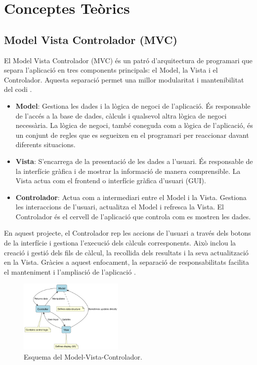 \documentclass{ieeetj}
\begin{document}
\section{Conceptes Teòrics} 

\subsection{Model Vista Controlador (MVC)} 
El Model Vista Controlador (MVC) és un patró d'arquitectura de programari que separa l'aplicació en tres components principals: el Model, la Vista i el Controlador. Aquesta separació permet una millor modularitat i mantenibilitat del codi \cite{MVC_Theory}.

\begin{itemize} 
    \item \textbf{Model}: Gestiona les dades i la lògica de negoci de l'aplicació. És responsable de l'accés a la base de dades, càlculs i qualsevol altra lògica de negoci necessària. La lògica de negoci, també coneguda com a lògica de l'aplicació, és un conjunt de regles que es segueixen en el programari per reaccionar davant diferents situacions.
    \item \textbf{Vista}: S'encarrega de la presentació de les dades a l'usuari. És responsable de la interfície gràfica i de mostrar la informació de manera comprensible. La Vista actua com el frontend o interfície gràfica d'usuari (GUI).
    \item \textbf{Controlador}: Actua com a intermediari entre el Model i la Vista. Gestiona les interaccions de l'usuari, actualitza el Model i refresca la Vista. El Controlador és el cervell de l'aplicació que controla com es mostren les dades.
\end{itemize}

En aquest projecte, el Controlador rep les accions de l'usuari a través dels botons de la interfície i gestiona l'execució dels càlculs corresponents. Això inclou la creació i gestió dels fils de càlcul, la recollida dels resultats i la seva actualització en la Vista. Gràcies a aquest enfocament, la separació de responsabilitats facilita el manteniment i l'ampliació de l'aplicació \cite{mvcPattern}.

\begin{figure}[htbp] 
    \centerline{\includegraphics[width=0.45\textwidth]{png/MVC.png}} 
    \caption{Esquema del Model-Vista-Controlador.} 
    \label{fig:mvc} 
\end{figure}
\end{document}
